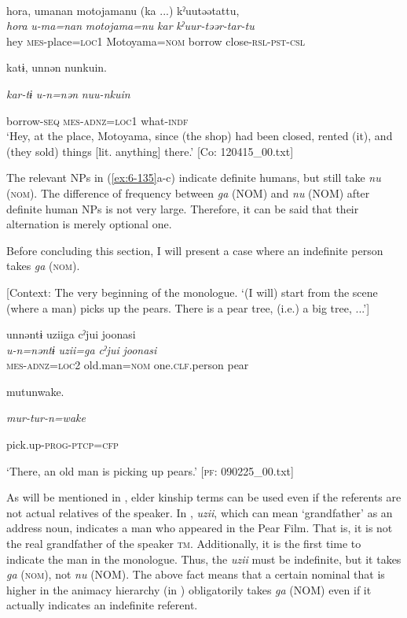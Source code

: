 \begin{table}
\begin{styleBeschriftung}
\ex{}\\
{\TM}
\glll  {\textbar}hora{\textbar},  umanan  motojamanu  (ka ...)  kˀuutəətattu,\\
\textit{hora}  \textit{u-ma=nan}  \textit{motojama=nu}  \textit{kar}  \textit{kˀuur-təər-tar-tu}\\
hey  \textsc{mes}-place=\textsc{loc}1  Motoyama=\textsc{nom}  borrow  close-\textsc{rsl}-\textsc{pst}-\textsc{csl}

      katɨ,  unnən  nunkuin.

      \textit{kar-tɨ}  \textit{u-n=nən}  \textit{nuu-nkuin}

      borrow-\textsc{seq}  \textsc{mes}-\textsc{adnz}=\textsc{loc}1  what-\textsc{indf}\\
\glt ‘Hey, at the place, Motoyama, since (the shop) had been closed, rented (it), and (they sold) things [lit. anything] there.’ [Co: 120415\_00.txt]
\z

The relevant NPs in (\ref{ex:6-135}a-c) indicate definite humans, but still take \textit{nu} (\textsc{nom}). The difference of frequency between \textit{ga} (NOM) and \textit{nu} (NOM) after definite human NPs is not very large. Therefore, it can be said that their alternation is merely optional one.

  Before concluding this section, I will present a case where an indefinite person takes \textit{ga} (\textsc{nom}).

\ea\label{ex:6-136}
  [Context: The very beginning of the monologue. {\TM} ‘(I will) start from the scene (where a man) picks up the pears. There is a pear tree, (i.e.) a big tree, ...’]

{\TM}
\glll unnəntɨ  uziiga  cˀjui  joonasi\\
\textit{u-n=nəntɨ}  \textit{uzii=ga}  \textit{cˀjui}  \textit{joonasi}\\

    \textsc{mes}-\textsc{adnz}=\textsc{loc}2  old.man=\textsc{nom}  one.\textsc{clf}.person  pear

    mutunwake.

    \textit{mur-tur-n=wake}

    pick.up-\textsc{prog}-\textsc{ptcp}=\textsc{cfp}

\glt    ‘There, an old man is picking up pears.’ [\textsc{pf}: 090225\_00.txt]
\z

As will be mentioned in , elder kinship terms can be used even if the referents are not actual relatives of the speaker. In , \textit{uzii}, which can mean ‘grandfather’ as an address noun, indicates a man who appeared in the Pear Film. That is, it is not the real grandfather of the speaker \textsc{tm}. Additionally, it is the first time to indicate the man in the monologue. Thus, the \textit{uzii} must be indefinite, but it takes \textit{ga} (\textsc{nom}), not \textit{nu} (NOM). The above fact means that a certain nominal that is higher in the animacy hierarchy (in ) obligatorily takes \textit{ga} (NOM) even if it actually indicates an indefinite referent.


\end{styleBeschriftung}
\end{table}
